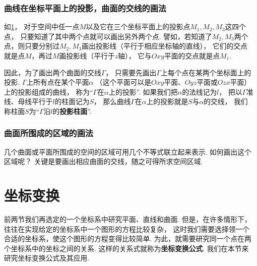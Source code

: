 \subsubsection{曲线在坐标平面上的投影，曲面的交线的画法}
如\cref{figure:解析几何.点在坐标平面上的投影}，
对于空间中任一点\(M\)以及它在三个坐标平面上的投影点\(M_1,M_2,M_3\)这四个点，
只要知道了其中两个点就可以画出另外两个点.
譬如，若知道了\(M_2,M_3\)两个点，则只要分别过\(M_2,M_3\)画出投影线（平行于相应坐标轴的直线），
它们的交点就是点\(M\)，再过\(M\)画投影线（平行于\(z\)轴），
它与\(Oxy\)平面的交点就是点\(M_1\).

\begin{figure}[ht]
	\centering
	\caption{}
	\label{figure:解析几何.点在坐标平面上的投影}
\end{figure}

因此，为了画出两个曲面的交线\(\Gamma\)，
只需要先画出\(\Gamma\)上每个点在某两个坐标面上的投影.
\(\Gamma\)上所有点在某个平面\(\alpha\)
（这个平面可以是\(Oxy\)平面、\(Oyz\)平面或\(Ozx\)平面）
上的投影组成的曲线，
称为“\(\Gamma\)在\(\alpha\)上的投影”.
如果我们把\(\alpha\)的法线记为\(l\)，
把以\(\Gamma\)准线、母线平行于\(l\)的柱面记为\(S\)，
那么曲线\(\Gamma\)在\(\alpha\)上的投影就是\(S\)与\(\alpha\)的交线，
我们称柱面\(S\)为“\(\Gamma\)沿\(l\)的\textbf{投影柱面}”.

\subsubsection{曲面所围成的区域的画法}
几个曲面或平面所围成的空间的区域可用几个不等式联立起来表示.
如何画出这个区域呢？
关键是要画出相应曲面的交线，随之可得所求空间区域.

\section{坐标变换}
前两节我们再选定的一个坐标系中研究平面、直线和曲面.
但是，在许多情形下，往往在实现给定的坐标系中一个图形的方程比较复杂，
这时我们需要选择领一个合适的坐标系，使这个图形的方程变得比较简单.
为此，就需要研究同一个点在两个坐标系中的坐标之间的关系.
这样的关系式就称为\textbf{坐标变换公式}.
我们在本节来研究坐标变换公式及其应用.

